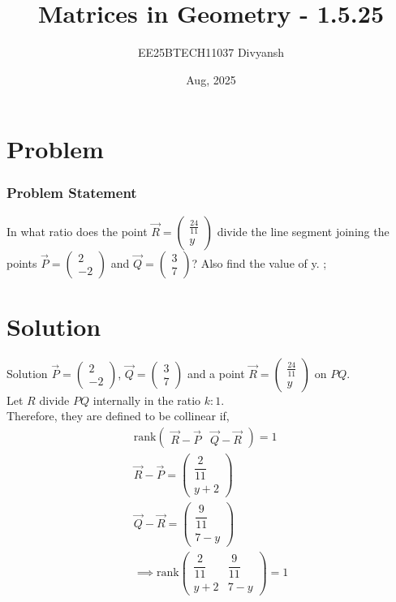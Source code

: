 \documentclass{beamer}
\title{Matrices in Geometry - 1.5.25}
\author{EE25BTECH11037  Divyansh}
\date{Aug, 2025}
\theoremstyle{remark}
\newcommand{\myvec}[1]{\ensuremath{\begin{pmatrix}#1\end{pmatrix}}}
\begin{document}
\maketitle


\begin{frame}
\tableofcontents
\end{frame}
\section{Problem}
\begin{frame}
\frametitle{Problem Statement}
In what ratio does the point $\vec{R}=\myvec{\frac{24}{11} \\ y}$ divide the line segment joining the points $\vec{P}=\myvec{2 \\ -2}$ and $\vec{Q}=\myvec{3 \\ 7}$? Also find the value of y.
;\end{frame}

\section{Solution}
\begin{frame}{Solution}
   $\vec{P}=\myvec{2\\-2}$, $\vec{Q}=\myvec{3\\7}$ and a point $\vec{R}=  \myvec{\frac{24}{11} \\ y}$ on $PQ$. \\
   Let $R$ divide $PQ$ internally in the ratio $k:1$.\\
   Therefore, they are defined to be collinear if,
   \begin{align*}
    \text{rank}\myvec{\vec{R}- \vec{P} & \vec{Q}-\vec{R}}=1\\
    \vec{R}-\vec{P}=\myvec{\dfrac{2}{11} \\ y+2}\\
    \vec{Q}-\vec{R}=\myvec{\dfrac{9}{11} \\ 7-y}\\
    \implies \text{rank}\myvec{\dfrac{2}{11} & \dfrac{9}{11} \\ y+2 & 7-y} = 1
\end{align*}
\end{frame}
\end{document}
